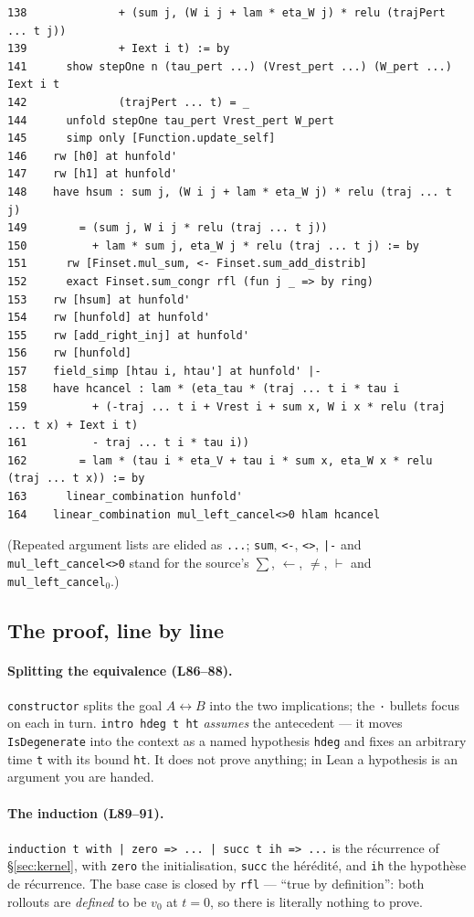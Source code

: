\documentclass[11pt]{article}
\begin{document}
\begin{verbatim}
138              + (sum j, (W i j + lam * eta_W j) * relu (trajPert ... t j))
139              + Iext i t) := by
141      show stepOne n (tau_pert ...) (Vrest_pert ...) (W_pert ...) Iext i t
142              (trajPert ... t) = _
144      unfold stepOne tau_pert Vrest_pert W_pert
145      simp only [Function.update_self]
146    rw [h0] at hunfold'
147    rw [h1] at hunfold'
148    have hsum : sum j, (W i j + lam * eta_W j) * relu (traj ... t j)
149        = (sum j, W i j * relu (traj ... t j))
150          + lam * sum j, eta_W j * relu (traj ... t j) := by
151      rw [Finset.mul_sum, <- Finset.sum_add_distrib]
152      exact Finset.sum_congr rfl (fun j _ => by ring)
153    rw [hsum] at hunfold'
154    rw [hunfold] at hunfold'
155    rw [add_right_inj] at hunfold'
156    rw [hunfold]
157    field_simp [htau i, htau'] at hunfold' |-
158    have hcancel : lam * (eta_tau * (traj ... t i * tau i
159          + (-traj ... t i + Vrest i + sum x, W i x * relu (traj ... t x) + Iext i t)
161          - traj ... t i * tau i))
162        = lam * (tau i * eta_V + tau i * sum x, eta_W x * relu (traj ... t x)) := by
163      linear_combination hunfold'
164    linear_combination mul_left_cancel<>0 hlam hcancel
\end{verbatim}
(Repeated argument lists are elided as \texttt{...}; \texttt{sum},
\texttt{<-}, \texttt{<>}, \texttt{|-} and \texttt{mul\_left\_cancel<>0} stand
for the source's $\sum$, $\leftarrow$, $\neq$, $\vdash$ and
\texttt{mul\_left\_cancel}$_0$.)

\subsection{The proof, line by line}
\label{sec:leanlines}

\paragraph{Splitting the equivalence (L86--88).} \texttt{constructor} splits
the goal $A\leftrightarrow B$ into the two implications; the \texttt{·}
bullets focus on each in turn. \texttt{intro hdeg t ht} \emph{assumes} the
antecedent --- it moves \texttt{IsDegenerate} into the context as a named
hypothesis \texttt{hdeg} and fixes an arbitrary time \texttt{t} with its
bound \texttt{ht}. It does not prove anything; in Lean a hypothesis is an
argument you are handed.

\paragraph{The induction (L89--91).} \texttt{induction t with | zero => ...
| succ t ih => ...} is the r\'ecurrence of \S\ref{sec:kernel}, with
\texttt{zero} the initialisation, \texttt{succ} the h\'er\'edit\'e, and
\texttt{ih} the hypoth\`ese de r\'ecurrence. The base case is closed by
\texttt{rfl} --- ``true by definition'': both rollouts are \emph{defined} to
be $v_0$ at $t=0$, so there is literally nothing to prove.
\end{document}
